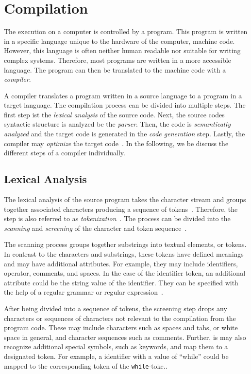 \section{Compilation}
The execution on a computer is controlled by a program. This program is written in a specific language unique to the hardware of the computer, machine code. However, this language is often neither human readable nor suitable for writing complex systems. Therefore, most programs are written in a more accessible language. The program can then be translated to the machine code with a \emph{compiler}. 

A compiler translates a program written in a source language to a program in a target language. The compilation process can be divided into multiple steps. The first step ist the \emph{lexical analysis} of the source code. Next, the source codes syntactic structure is analyzed be the \emph{parser}. Then, the code is \emph{semantically analyzed} and the target code is generated in the \emph{code generation} step. Lastly, the compiler may \emph{optimize} the target code~\cite{Oliv07}. In the following, we be discuss the different steps of a compiler individually.

\subsection{Lexical Analysis}
The lexical analysis of the source program takes the character stream and groups together associated characters producing a sequence of tokens~\cite{Oliv07}. Therefore, the step is also referred to as \emph{tokenization}~\cite{Gref99}. The process can be divided into the \emph{scanning} and \emph{screening} of the character and token sequence~\cite{DeRe74}.

The scanning process groups together substrings into textual elements, or tokens. In contrast to the characters and substrings, these tokens have defined meanings and may have additional attributes. For example, they may include identifiers, operator, comments, and spaces. In the case of the identifier token, an additional attribute could be the string value of the identifier. They can be specified with the help of a regular grammar or regular expression~\cite{DeRe74,VSSD07}.  

After being divided into a sequence of tokens, the screening step drops any characters or sequences of characters not relevant to the compilation from the program code. 
These may include characters such as spaces and tabs, or white space in general, and character sequences such as comments. 
Further, is may also recognize additional special symbols, such as keywords, and map them to a designated token. For example, a identifier with a value of ``while'' could be mapped to the corresponding token of the \texttt{while}-toke.\cite{DeRe74}.

